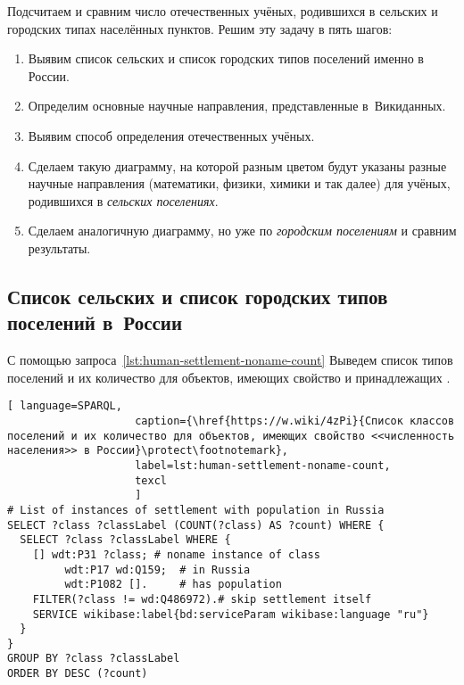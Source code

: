 Подсчитаем и сравним число отечественных учёных, родившихся в сельских и городских типах населённых пунктов. 
Решим эту задачу в пять шагов:
\begin{enumerate}
  \item Выявим список сельских и список городских типов поселений именно в России.
  \item Определим основные научные направления, представленные в~Викиданных.
  \item Выявим способ определения отечественных учёных.
  \item Сделаем такую диаграмму, на которой разным цветом будут указаны разные научные направления (математики, физики, химики и так далее) для учёных, родившихся в \emph{сельских поселениях}.
  \item Сделаем аналогичную диаграмму, но уже по \emph{городским поселениям} и сравним результаты.
\end{enumerate}


\subsection{Список сельских и список городских типов поселений в~России}%
\label{sec:list-village-city-types-in-Russia}

С помощью запроса~\ref{lst:human-settlement-noname-count} 
Выведем список типов поселений и их количество для объектов, 
имеющих свойство  
и принадлежащих . 

\begin{lstlisting}[ language=SPARQL, 
                    caption={\href{https://w.wiki/4zPi}{Список классов поселений и их количество для объектов, имеющих свойство <<численность населения>> в России}\protect\footnotemark},
                    label=lst:human-settlement-noname-count,
                    texcl 
                    ]
# List of instances of settlement with population in Russia
SELECT ?class ?classLabel (COUNT(?class) AS ?count) WHERE {
  SELECT ?class ?classLabel WHERE {
    [] wdt:P31 ?class; # noname instance of class
         wdt:P17 wd:Q159;  # in Russia
         wdt:P1082 [].     # has population
    FILTER(?class != wd:Q486972).# skip settlement itself
    SERVICE wikibase:label{bd:serviceParam wikibase:language "ru"}
  }
}
GROUP BY ?class ?classLabel
ORDER BY DESC (?count)
\end{lstlisting}%

